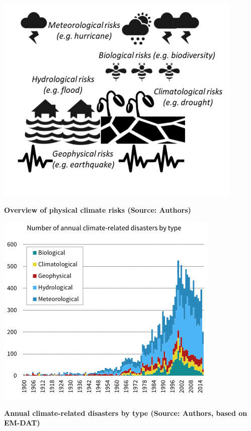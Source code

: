 \documentclass[10pt,table,a4]{article}\usepackage[]{graphicx}\usepackage[]{color}
\begin{document}
	\begin{multicols}{2}
		\includegraphics[width=1\linewidth]{ReportGraphics/PhysicalClimateRisks.png}
		
		\textbf{\small Overview of physical climate risks (Source: Authors)}
	
		\includegraphics[width=1\linewidth]{ReportGraphics/ClimateDisasters.png}
		
		\textbf{\small Annual climate-related disasters by type (Source: Authors, based on EM-DAT)}
	\end{multicols}
\end{document}
